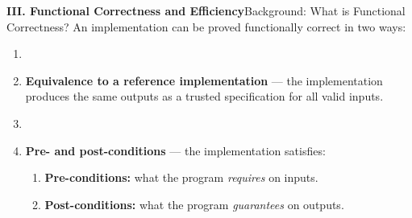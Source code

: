 \documentclass[10pt,aspectratio=1610,compress,dvipsnames]{beamer}
\begin{document}
\begin{frame}[fragile]{\bfseries III. Functional Correctness and Efficiency}{Background: What is Functional Correctness?}
An implementation can be proved functionally correct in two ways:
\begin{enumerate}[(1)]
	\item[]
	\item \colorbox{-blue}{\textbf{Equivalence to a reference implementation}}\; --- the implementation produces the same outputs as a trusted specification for all valid inputs.
	\item[]
	\item \colorbox{-blue}{\textbf{Pre- and post-conditions}}\; --- the implementation satisfies:
	\begin{enumerate}[$\bullet$]
		\item \textbf{Pre-conditions:} what the program \emph{requires} on inputs.
		\item \textbf{Post-conditions:} what the program \emph{guarantees} on outputs.
	\end{enumerate}
\end{enumerate}
\vfill
\end{frame}
\end{document}
